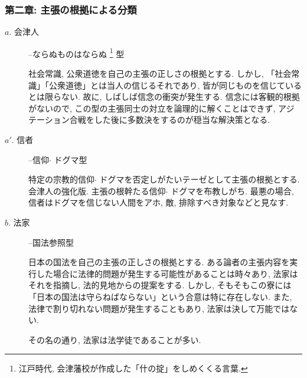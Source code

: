 \documentclass[10pt,b5jsbook,dvips,dvipdfmx,openany]{jsbook}
\theoremstyle{definition}
\begin{document}
			\subsubsection{第二章: 主張の根拠による分類}

			\begin{description}

			\item[$a$. 会津人]--ならぬものはならぬ \footnote{江戸時代, 会津藩校が作成した「什の掟」をしめくくる言葉. } 型

			社会常識, 公衆道徳を自己の主張の正しさの根拠とする. しかし, 「社会常識」「公衆道徳」とは当人の信じるそれであり, 皆が同じものを信じているとは限らない. 故に, しばしば信念の衝突が発生する. 信念には客観的根拠がないので, この型の主張同士の対立を論理的に解くことはできず, アジテーション合戦をした後に多数決をするのが穏当な解決策となる.


			\item[$a'$. 信者]--信仰$ \cdot $ ドグマ型

			特定の宗教的信仰$ \cdot $ ドグマを否定しがたいテーゼとして主張の根拠とする. 会津人の強化版. 主張の根幹たる信仰$ \cdot $ ドグマを布教しがち. 最悪の場合, 信者はドグマを信じない人間をアホ, 敵, 排除すべき対象などと見なす.


			\item[$b$. 法家]--国法参照型

			日本の国法を自己の主張の正しさの根拠とする. ある論者の主張内容を実行した場合に法律的問題が発生する可能性があることは時々あり, 法家はそれを指摘し, 法的見地からの提案をする. しかし, そもそもこの寮には「日本の国法は守らねばならない」という合意は特に存在しない. また, 法律で割り切れない問題が発生することもあり, 法家は決して万能ではない.

			その名の通り, 法家は法学徒であることが多い.
			\end{description}
\end{document}
